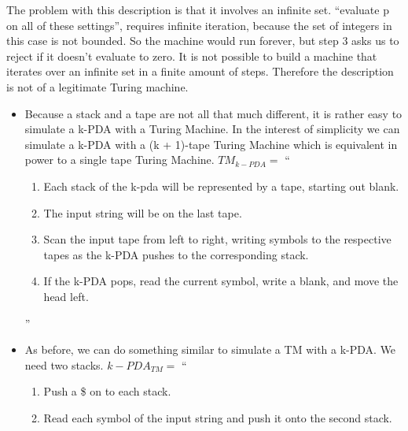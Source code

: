 \begin{problem}{4}
  \begin{solution}
    The problem with this description is that it involves an infinite set. ``evaluate p on all of these settings'',
    requires infinite iteration, because the set of integers in this case is not bounded. So the machine would run
    forever, but step 3 asks us to reject if it doesn't evaluate to zero. It is not possible to build a machine that
    iterates over an infinite set in a finite amount of steps.  Therefore the description is not of a legitimate Turing
    machine.
  \end{solution}
\end{problem}

\begin{problem}{5}
  \begin{solution}
    \begin{itemize}
      \item Because a stack and a tape are not all that much different, it is rather easy to simulate a k-PDA with a
      Turing Machine.  In the interest of simplicity we can simulate a k-PDA with a (k + 1)-tape Turing Machine which is
      equivalent in power to a single tape Turing Machine.
      $TM_{k-PDA} = $ ``
      \begin{enumerate}
        \item Each stack of the k-pda will be represented by a tape, starting out blank. \\
        \item The input string will be on the last tape. \\
        \item Scan the input tape from left to right, writing symbols to the respective tapes as the k-PDA pushes to the corresponding stack. \\
        \item If the k-PDA pops, read the current symbol, write a blank, and move the head left.
      \end{enumerate}
      '' \\
      \item As before, we can do something similar to simulate a TM with a k-PDA. We need two stacks.
      $k-PDA_{TM} =$ ``
        \begin{enumerate}
          \item Push a \$ on to each stack. \\
          \item Read each symbol of the input string and push it onto the second stack. \\

\end{enumerate}
\end{itemize}
\end{solution}
\end{problem}
